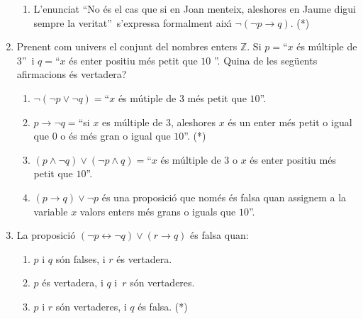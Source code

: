 \begin{enumerate}
\begin{enumerate}
\item L'enunciat \textquotedblleft No \'{e}s el cas que si en Joan menteix,
aleshores en Jaume digui sempre la veritat\textquotedblright\ s'expressa
formalment aix\'{\i} $\lnot\left(  \lnot p\longrightarrow q\right)  $. (*)
\end{enumerate}

\item Prenent com univers el conjunt del nombres enters $\mathbb{Z}$. Si
$p=$\textquotedblleft$x$ \'{e}s m\'{u}ltiple de $3$\textquotedblright\ i
$q=$\textquotedblleft$x$ \'{e}s enter positiu m\'{e}s petit que $10$%
\textquotedblright. Quina de les seg\"{u}ents afirmacions \'{e}s vertadera?

\begin{enumerate}
\item $\lnot\left(  \lnot p\vee\lnot q\right)  =$\textquotedblleft$x$ \'{e}s
m\'{u}tiple de $3$ m\'{e}s petit que $10$\textquotedblright.

\item $p\longrightarrow\lnot q=$\textquotedblleft si $x$ es m\'{u}ltiple de
$3$, aleshores $x$ \'{e}s un enter m\'{e}s petit o igual que $0$ o \'{e}s
m\'{e}s gran o igual que $10$\textquotedblright. (*)

\item $\left(  p\wedge\lnot q\right)  \vee\left(  \lnot p\wedge q\right)
=$\textquotedblleft$x$ \'{e}s m\'{u}ltiple de $3$ o $x$ \'{e}s enter positiu
m\'{e}s petit que $10$\textquotedblright.

\item $\left(  p\longrightarrow q\right)  \vee\lnot p$ \'{e}s una
proposici\'{o} que nom\'{e}s \'{e}s falsa quan assignem a la variable $x$
valors enters m\'{e}s grans o iguals que $10$\textquotedblright.
\end{enumerate}

\item La proposici\'{o} $\left(  \lnot p\longleftrightarrow\lnot q\right)
\vee\left(  r\longrightarrow q\right)  $ \'{e}s falsa quan:

\begin{enumerate}
\item $p$ i $q$ s\'{o}n falses, i $r$ \'{e}s vertadera.

\item $p$ \'{e}s vertadera, i $q$ i~$r$ s\'{o}n vertaderes.

\item $p$ i $r$ s\'{o}n vertaderes, i $q$ \'{e}s falsa. (*)


\end{enumerate}
\end{enumerate}
